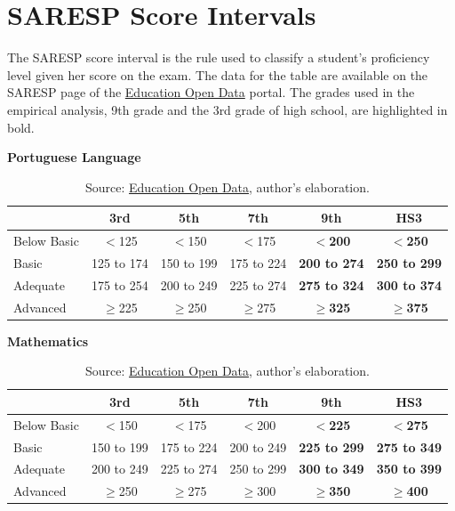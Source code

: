 \section{SARESP Score Intervals} \label{ap:apendice1}

The SARESP score interval is the rule used to classify a student's proficiency level given her score on the exam. The data for the table are available on the SARESP page of the \href{https://dados.educacao.sp.gov.br/story/saresp}{Education Open Data} portal. The grades used in the empirical analysis, 9th grade and the 3rd grade of high school, are highlighted in bold.

\begin{table}[hbt!]
    \centering
    \caption{Score Intervals}

    \renewcommand{\arraystretch}{1.4}

    \textbf{Portuguese Language}

    \begin{tabular}{lccccc}
        \hline
         & 3rd & 5th & 7th & \textbf{9th} & \textbf{HS3} \\
        \hline
        Below Basic & $<$125 & $<$150 & $<$175 & \textbf{$<$200} & \textbf{$<$250} \\
        Basic       & 125 to 174 & 150 to 199 & 175 to 224 & \textbf{200 to 274} & \textbf{250 to 299} \\
        Adequate    & 175 to 254 & 200 to 249 & 225 to 274 & \textbf{275 to 324} & \textbf{300 to 374} \\
        Advanced    & $\geq$225 & $\geq$250 & $\geq$275 & \textbf{$\geq$325} & \textbf{$\geq$375} \\
        \hline
    \end{tabular}

    \vspace{0.8cm}

    \textbf{Mathematics}

    \begin{tabular}{lccccc}
        \hline
         & 3rd & 5th & 7th & \textbf{9th} & \textbf{HS3} \\
        \hline
        Below Basic & $<$150 & $<$175 & $<$200 & \textbf{$<$225} & \textbf{$<$275} \\
        Basic       & 150 to 199 & 175 to 224 & 200 to 249 & \textbf{225 to 299} & \textbf{275 to 349} \\
        Adequate    & 200 to 249 & 225 to 274 & 250 to 299 & \textbf{300 to 349} & \textbf{350 to 399} \\
        Advanced    & $\geq$250 & $\geq$275 & $\geq$300 & \textbf{$\geq$350} & \textbf{$\geq$400} \\
        \hline
    \end{tabular}

    \caption*{Source: \href{https://dados.educacao.sp.gov.br/story/saresp}{Education Open Data}, author's elaboration.}
    \label{tab:intervalos_saresp}
\end{table}

